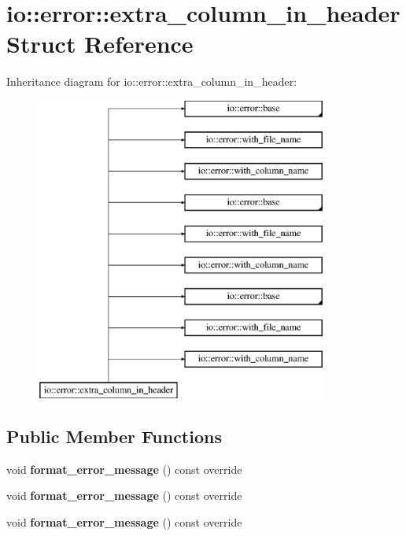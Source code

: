 \hypertarget{structio_1_1error_1_1extra__column__in__header}{}\section{io\+:\+:error\+:\+:extra\+\_\+column\+\_\+in\+\_\+header Struct Reference}
\label{structio_1_1error_1_1extra__column__in__header}
Inheritance diagram for io\+:\+:error\+:\+:extra\+\_\+column\+\_\+in\+\_\+header\+:\begin{figure}[H]
\begin{center}
\leavevmode
\includegraphics[height=10.000000cm]{d6/dc8/structio_1_1error_1_1extra__column__in__header}
\end{center}
\end{figure}
\subsection*{Public Member Functions}
\begin{DoxyCompactItemize}
\item 
\mbox{\label{structio_1_1error_1_1extra__column__in__header_a10fb0fe8533ea372c4055dd64f7fa01d}} 
void {\bfseries format\+\_\+error\+\_\+message} () const override
\item 
\mbox{\label{structio_1_1error_1_1extra__column__in__header_a10fb0fe8533ea372c4055dd64f7fa01d}} 
void {\bfseries format\+\_\+error\+\_\+message} () const override
\item 
\mbox{\label{structio_1_1error_1_1extra__column__in__header_a10fb0fe8533ea372c4055dd64f7fa01d}} 
void {\bfseries format\+\_\+error\+\_\+message} () const override
\end{DoxyCompactItemize}

